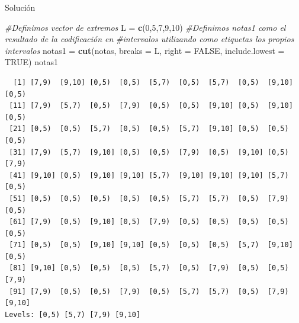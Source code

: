 \documentclass[
  ignorenonframetext,
  aspectratio=169]{beamer}
\newenvironment{Shaded}{\begin{snugshade}}{\end{snugshade}}
\newcommand{\AttributeTok}[1]{\textcolor[rgb]{0.13,0.29,0.53}{#1}}
\newcommand{\CommentTok}[1]{\textcolor[rgb]{0.56,0.35,0.01}{\textit{#1}}}
\newcommand{\ConstantTok}[1]{\textcolor[rgb]{0.56,0.35,0.01}{#1}}
\newcommand{\DecValTok}[1]{\textcolor[rgb]{0.00,0.00,0.81}{#1}}
\newcommand{\FunctionTok}[1]{\textcolor[rgb]{0.13,0.29,0.53}{\textbf{#1}}}
\newcommand{\NormalTok}[1]{#1}
\newcommand{\OtherTok}[1]{\textcolor[rgb]{0.56,0.35,0.01}{#1}}
\begin{document}
\begin{frame}[fragile]{Solución}
\label{soluciuxf3n-17}
\begin{Shaded}
\begin{Highlighting}[]
\CommentTok{\#Definimos vector de extremos}
\NormalTok{L }\OtherTok{=} \FunctionTok{c}\NormalTok{(}\DecValTok{0}\NormalTok{,}\DecValTok{5}\NormalTok{,}\DecValTok{7}\NormalTok{,}\DecValTok{9}\NormalTok{,}\DecValTok{10}\NormalTok{)}
\CommentTok{\#Definimos notas1 como el resultado de la codificación en }
\CommentTok{\#intervalos utilizando como etiquetas los propios intervalos}
\NormalTok{notas1 }\OtherTok{=} \FunctionTok{cut}\NormalTok{(notas, }\AttributeTok{breaks =}\NormalTok{ L, }\AttributeTok{right =} \ConstantTok{FALSE}\NormalTok{, }\AttributeTok{include.lowest =} \ConstantTok{TRUE}\NormalTok{)}
\NormalTok{notas1}
\end{Highlighting}
\end{Shaded}

\begin{verbatim}
  [1] [7,9)  [9,10] [0,5)  [0,5)  [5,7)  [0,5)  [5,7)  [0,5)  [9,10] [0,5) 
 [11] [7,9)  [5,7)  [0,5)  [7,9)  [0,5)  [0,5)  [9,10] [0,5)  [9,10] [0,5) 
 [21] [0,5)  [0,5)  [5,7)  [0,5)  [0,5)  [5,7)  [9,10] [0,5)  [0,5)  [0,5) 
 [31] [7,9)  [5,7)  [9,10] [0,5)  [0,5)  [7,9)  [0,5)  [9,10] [0,5)  [7,9) 
 [41] [9,10] [0,5)  [9,10] [9,10] [5,7)  [9,10] [9,10] [9,10] [5,7)  [0,5) 
 [51] [0,5)  [0,5)  [0,5)  [0,5)  [0,5)  [5,7)  [5,7)  [0,5)  [7,9)  [0,5) 
 [61] [7,9)  [0,5)  [9,10] [0,5)  [7,9)  [0,5)  [0,5)  [0,5)  [0,5)  [0,5) 
 [71] [0,5)  [0,5)  [9,10] [9,10] [0,5)  [0,5)  [0,5)  [5,7)  [9,10] [0,5) 
 [81] [9,10] [0,5)  [0,5)  [0,5)  [5,7)  [0,5)  [7,9)  [0,5)  [0,5)  [7,9) 
 [91] [7,9)  [0,5)  [0,5)  [7,9)  [0,5)  [5,7)  [5,7)  [0,5)  [7,9)  [9,10]
Levels: [0,5) [5,7) [7,9) [9,10]
\end{verbatim}
\end{frame}
\end{document}
